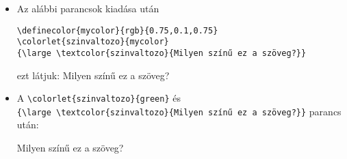 \documentclass{article}
\begin{document}
\begin{itemize}
	\item Az alábbi parancsok kiadása után
\begin{verbatim}
\definecolor{mycolor}{rgb}{0.75,0.1,0.75}
\colorlet{szinvaltozo}{mycolor}
{\large \textcolor{szinvaltozo}{Milyen színű ez a szöveg?}}		
\end{verbatim}
ezt látjuk:	
{\large \textcolor{szinvaltozo}{Milyen színű ez a szöveg?}}
	
	\item A \verb|\colorlet{szinvaltozo}{green}| és\\
	\verb|{\large \textcolor{szinvaltozo}{Milyen színű ez a szöveg?}}|
	parancs után:


{\large \textcolor{szinvaltozo}{Milyen színű ez a szöveg?}}
\end{itemize}
\end{document}
